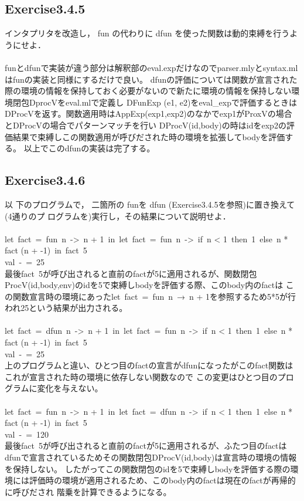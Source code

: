 \documentclass[a4paper,11pt,oneside,openany]{jsarticle}
\begin{document}
\subsection{Exercise3.4.5}
    インタプリタを改造し， fun の代わりに dfun を使った関数は動的束縛を行うようにせよ．\\\\
    funとdfunで実装が違う部分は解釈部のeval.expだけなのでparser.mlyとsyntax.mlはfunの実装と同様にするだけで良い。
    dfunの評価については関数が宣言された際の環境の情報を保持しておく必要がないので新たに環境の情報を保持しない環境閉包DprocVをeval.mlで定義し
    DFunExp (e1, e2)をeval\_expで評価するときはDProcVを返す。関数適用時はAppExp(exp1,exp2)のなかでexp1がProxVの場合とDProcVの場合でパターンマッチを行い
    DProcV(id,body)の時はidをexp2の評価結果で束縛しこの関数適用が呼びだされた時の環境を拡張してbodyを評価する。
    以上でこのdfunの実装は完了する。

\subsection{Exercise3.4.6}
    以 下のプログラムで， 二箇所の funを dfun (Exercise3.4.5を参照)に置き換えて(4通りのプ ログラムを)実行し，その結果について説明せよ．\\\\

    let\ fact\ =\ fun\ n\ ->\ n + 1\ in\ let\ fact\ =\ fun\ n\ ->\ if\ n < 1\ then\ 1\ else\ n * fact (n + -1)\ in\ fact\ 5\\
    val\ -\ =\ 25\\
    最後fact\ 5が呼び出されると直前のfactが5に適用されるが、関数閉包ProcV(id,body,env)のidを5で束縛しbodyを評価する際、このbody内のfactは
    この関数宣言時の環境にあったlet\ fact\ =\ fun\ n\ →\ n + 1を参照するため5*5が行われ25という結果が出力される。\\\\

    let\ fact\ =\ dfun\ n\ ->\ n + 1\ in\ let\ fact\ =\ fun\ n\ ->\ if\ n < 1\ then\ 1\ else\ n * fact (n + -1)\ in\ fact\ 5\\
    val\ -\ =\ 25\\
    上のプログラムと違い、ひとつ目のfactの宣言がdfunになったがこのfact関数はこれが宣言された時の環境に依存しない関数なので
    この変更はひとつ目のプログラムに変化を与えない。\\\\

    let\ fact\ =\ fun\ n\ ->\ n + 1\ in\ let\ fact\ =\ dfun\ n\ ->\ if\ n < 1\ then\ 1\ else\ n * fact (n + -1)\ in\ fact\ 5\\
    val\ -\ =\ 120\\
    最後fact\ 5が呼び出されると直前のfactが5に適用されるが、ふたつ目のfactはdfunで宣言されているためその関数閉包DProcV(id,body)は宣言時の環境の情報を保持しない。
    したがってこの関数閉包のidを5で束縛しbodyを評価する際の環境には評価時の環境が適用されるため、このbody内のfactは現在のfactが再帰的に呼びだされ
    階乗を計算できるようになる。\\\\
\end{document}
